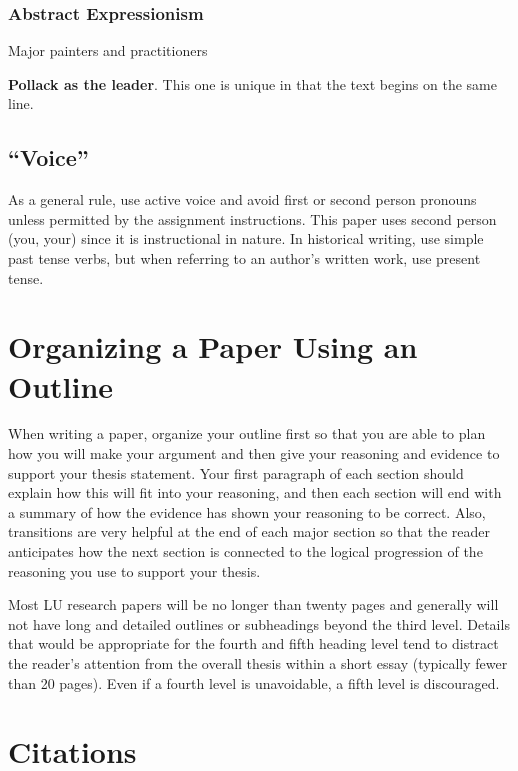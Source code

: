 \documentclass[raggedright]{turabian-researchpaper}
\newcommand*{\subsubsubsection}[1]{#1}
\newcommand*{\subsubsubsubsection}[1]{\textbf{#1}}
\begin{document}
\subsubsection{Abstract Expressionism}

\subsubsubsection{Major painters and practitioners}

\subsubsubsubsection{Pollack as the leader}. This one is unique in that the text
begins on the same line.

\subsection{``Voice''}

As a general rule, use active voice and avoid first or second person pronouns
unless permitted by the assignment instructions. This paper uses second person
(you, your) since it is instructional in nature. In historical writing, use
simple past tense verbs, but when referring to an author's written work, use
present tense.

\section{Organizing a Paper Using an Outline}

When writing a paper, organize your outline first so that you are able to plan
how you will make your argument and then give your reasoning and evidence to
support your thesis statement. Your first paragraph of each section should
explain how this will fit into your reasoning, and then each section will end
with a summary of how the evidence has shown your reasoning to be correct. Also,
transitions are very helpful at the end of each major section so that the reader
anticipates how the next section is connected to the logical progression of the
reasoning you use to support your thesis.

Most LU research papers will be no longer than twenty pages and generally will
not have long and detailed outlines or subheadings beyond the third level.
Details that would be appropriate for the fourth and fifth heading level tend to
distract the reader's attention from the overall thesis within a short essay
(typically fewer than 20 pages). Even if a fourth level is unavoidable, a fifth
level is discouraged.

\section{Citations}
\end{document}
